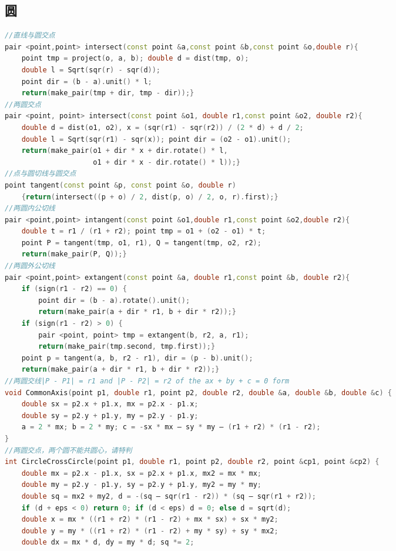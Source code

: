 \documentclass[landscape,a4paper]{article}
\begin{document}
\begin{spacing}{0.3}
\begin{multicols}{2}
\subsection{圆}
\begin{lstlisting}[language=C++]
//直线与圆交点
pair <point,point> intersect(const point &a,const point &b,const point &o,double r){
    point tmp = project(o, a, b); double d = dist(tmp, o);
    double l = Sqrt(sqr(r) - sqr(d));
    point dir = (b - a).unit() * l;
    return(make_pair(tmp + dir, tmp - dir));}
//两圆交点
pair <point, point> intersect(const point &o1, double r1,const point &o2, double r2){
    double d = dist(o1, o2), x = (sqr(r1) - sqr(r2)) / (2 * d) + d / 2;
    double l = Sqrt(sqr(r1) - sqr(x)); point dir = (o2 - o1).unit();
    return(make_pair(o1 + dir * x + dir.rotate() * l,
                     o1 + dir * x - dir.rotate() * l));}
//点与圆切线与圆交点
point tangent(const point &p, const point &o, double r)
    {return(intersect((p + o) / 2, dist(p, o) / 2, o, r).first);}
//两圆内公切线
pair <point,point> intangent(const point &o1,double r1,const point &o2,double r2){
    double t = r1 / (r1 + r2); point tmp = o1 + (o2 - o1) * t;
    point P = tangent(tmp, o1, r1), Q = tangent(tmp, o2, r2);
    return(make_pair(P, Q));}
//两圆外公切线
pair <point,point> extangent(const point &a, double r1,const point &b, double r2){
    if (sign(r1 - r2) == 0) {
        point dir = (b - a).rotate().unit();
        return(make_pair(a + dir * r1, b + dir * r2));}
    if (sign(r1 - r2) > 0) {
		pair <point, point> tmp = extangent(b, r2, a, r1);
        return(make_pair(tmp.second, tmp.first));}
    point p = tangent(a, b, r2 - r1), dir = (p - b).unit();
    return(make_pair(a + dir * r1, b + dir * r2));}
//两圆交线|P - P1| = r1 and |P - P2| = r2 of the ax + by + c = 0 form
void CommonAxis(point p1, double r1, point p2, double r2, double &a, double &b, double &c) {
	double sx = p2.x + p1.x, mx = p2.x - p1.x;
	double sy = p2.y + p1.y, my = p2.y - p1.y;
	a = 2 * mx; b = 2 * my; c = -sx * mx – sy * my – (r1 + r2) * (r1 - r2);
}
//两圆交点，两个圆不能共圆心，请特判
int CircleCrossCircle(point p1, double r1, point p2, double r2, point &cp1, point &cp2) {
	double mx = p2.x - p1.x, sx = p2.x + p1.x, mx2 = mx * mx;
	double my = p2.y - p1.y, sy = p2.y + p1.y, my2 = my * my;
	double sq = mx2 + my2, d = -(sq – sqr(r1 - r2)) * (sq – sqr(r1 + r2));
	if (d + eps < 0) return 0; if (d < eps) d = 0; else d = sqrt(d);
	double x = mx * ((r1 + r2) * (r1 - r2) + mx * sx) + sx * my2;
	double y = my * ((r1 + r2) * (r1 - r2) + my * sy) + sy * mx2;
	double dx = mx * d, dy = my * d; sq *= 2;

\end{lstlisting}
\end{multicols}
\end{spacing}
\end{document}
